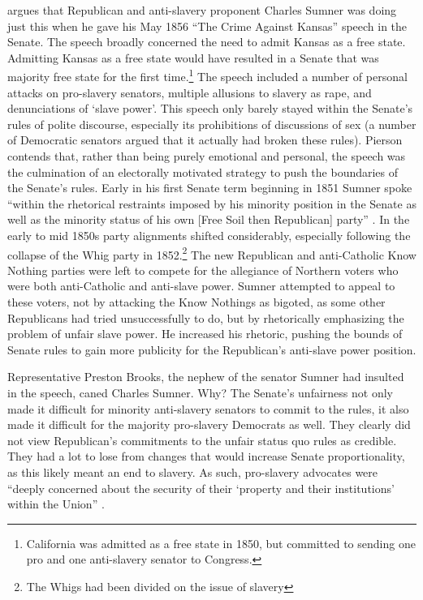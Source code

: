 \documentclass[a4paper]{article}\usepackage[]{graphicx}\usepackage[]{color}
\begin{document}
\cite{Pierson1995} argues that Republican and anti-slavery proponent Charles Sumner was doing just this when he gave his May 1856 ``The Crime Against Kansas'' speech in the Senate. The speech broadly concerned the need to admit Kansas as a free state. Admitting Kansas as a free state would have resulted in a Senate that was majority free state for the first time.\footnote{California was admitted as a free state in 1850, but committed to sending one pro and one anti-slavery senator to Congress.} The speech included a number of personal attacks on pro-slavery senators, multiple allusions to slavery as rape, and denunciations of `slave power'. This speech only barely stayed within the Senate's rules of polite discourse, especially its prohibitions of discussions of sex (a number of Democratic senators argued that it actually had broken these rules). Pierson contends that, rather than being purely emotional and personal, the speech was the culmination of an electorally motivated strategy to push the boundaries of the Senate's rules. Early in his first Senate term beginning in 1851 Sumner spoke ``within the rhetorical restraints imposed by his minority position in the Senate as well as the minority status of his own [Free Soil then Republican] party'' \cite[534]{Pierson1995}. In the early to mid 1850s party alignments shifted considerably, especially following the collapse of the Whig party in 1852.\footnote{The Whigs had been divided on the issue of slavery} The new Republican and anti-Catholic Know Nothing parties were left to compete for the allegiance of Northern voters who were both anti-Catholic and anti-slave power. Sumner attempted to appeal to these voters, not by attacking the Know Nothings as bigoted, as some other Republicans had tried unsuccessfully to do, but by rhetorically emphasizing the problem of unfair slave power. He increased his rhetoric, pushing the bounds of Senate rules to gain more publicity for the Republican's anti-slave power position.

Representative Preston Brooks, the nephew of the senator Sumner had insulted in the speech, caned Charles Sumner. Why? The Senate's unfairness not only made it difficult for minority anti-slavery senators to commit to the rules, it also made it difficult for the majority pro-slavery Democrats as well. They clearly did not view Republican's commitments to the unfair status quo rules as credible. They had a lot to lose from changes that would increase Senate proportionality, as this likely meant an end to slavery. As such, pro-slavery advocates were ``deeply concerned about the security of their `property and their institutions' within the Union'' \cite[281]{Mittal2013}.
\end{document}
